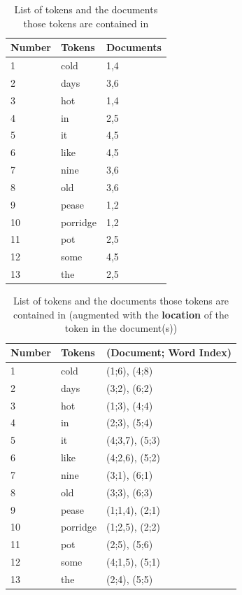 \documentclass{article}
\begin{document}
\begin{table}
	\centering
	\begin{tabular}{|l|l|l|}
		\hline
		\textbf{Number} & \textbf{Tokens} & \textbf{Documents} \\
		\hline
		1 & cold & 1,4 \\
		2 & days & 3,6 \\
		3 & hot & 1,4 \\
		4 & in & 2,5 \\
		5 & it & 4,5 \\
		6 & like & 4,5 \\
		7 & nine & 3,6 \\
		8 & old & 3,6 \\
		9 & pease & 1,2 \\
		10 & porridge & 1,2 \\		
		11 & pot & 2,5 \\
		12 & some & 4,5 \\
		13 & the & 2,5 \\		
		\hline
	\end{tabular}
	\caption{List of tokens and the documents those tokens are contained in}
	\label{tab:word-doc}
\end{table}

\begin{table}
	\centering
	\begin{tabular}{|l|l|l|}
		\hline
		\textbf{Number} & \textbf{Tokens} & \textbf{(Document; Word Index)} \\
		\hline		
		1 & cold & (1;6), (4;8) \\
		2 & days & (3;2), (6;2) \\
		3 & hot & (1;3), (4;4) \\
		4 & in & (2;3), (5;4) \\
		5 & it & (4;3,7), (5;3) \\
		6 & like & (4;2,6), (5;2) \\
		7 & nine & (3;1), (6;1) \\
		8 & old & (3;3), (6;3) \\
		9 & pease & (1;1,4), (2;1) \\
		10 & porridge & (1;2,5), (2;2) \\		
		11 & pot & (2;5), (5;6) \\
		12 & some & (4;1,5), (5;1) \\
		13 & the & (2;4), (5;5) \\	
		\hline
	\end{tabular}
	\caption{List of tokens and the documents those tokens are contained in (augmented with the \textbf{location} of the token in the document(s))}
	\label{tab:word-doc-sophisticated}
\end{table}
\end{document}
